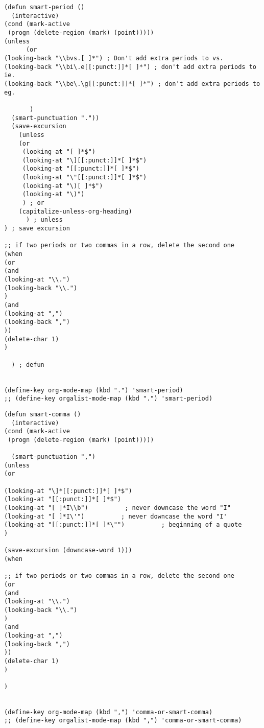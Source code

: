 \documentclass[11pt]{article}
\begin{document}
\label{sec:orgaad48c0}
\begin{verbatim}
(defun smart-period ()
  (interactive)
(cond (mark-active
 (progn (delete-region (mark) (point))))) 
(unless
      (or
(looking-back "\\bvs.[ ]*") ; Don't add extra periods to vs.
(looking-back "\\bi\.e[[:punct:]]*[ ]*") ; don't add extra periods to ie.
(looking-back "\\be\.\g[[:punct:]]*[ ]*") ; don't add extra periods to eg.

       )
  (smart-punctuation "."))
  (save-excursion
    (unless
	(or
	 (looking-at "[ ]*$")
	 (looking-at "\][[:punct:]]*[ ]*$")
	 (looking-at "[[:punct:]]*[ ]*$")
	 (looking-at "\"[[:punct:]]*[ ]*$")
	 (looking-at "\)[ ]*$")
	 (looking-at "\)")
	 ) ; or
    (capitalize-unless-org-heading)
      ) ; unless
) ; save excursion

;; if two periods or two commas in a row, delete the second one 
(when 
(or
(and
(looking-at "\\.")
(looking-back "\\.")
) 
(and
(looking-at ",")
(looking-back ",")
))
(delete-char 1)
)

  ) ; defun


(define-key org-mode-map (kbd ".") 'smart-period)
;; (define-key orgalist-mode-map (kbd ".") 'smart-period)
\end{verbatim}

\label{sec:orgc9d9c33}
\begin{verbatim}
(defun smart-comma ()
  (interactive)
(cond (mark-active
 (progn (delete-region (mark) (point))))) 

  (smart-punctuation ",")
(unless
(or

(looking-at "\]*[[:punct:]]*[ ]*$")
(looking-at "[[:punct:]]*[ ]*$")
(looking-at "[ ]*I\\b")          ; never downcase the word "I"
(looking-at "[ ]*I\'")          ; never downcase the word "I'
(looking-at "[[:punct:]]*[ ]*\"")          ; beginning of a quote
)

(save-excursion (downcase-word 1)))
(when

;; if two periods or two commas in a row, delete the second one
(or
(and
(looking-at "\\.")
(looking-back "\\.")
) 
(and
(looking-at ",")
(looking-back ",")
))
(delete-char 1)
)

)


(define-key org-mode-map (kbd ",") 'comma-or-smart-comma)
;; (define-key orgalist-mode-map (kbd ",") 'comma-or-smart-comma)
\end{verbatim}
\end{document}
